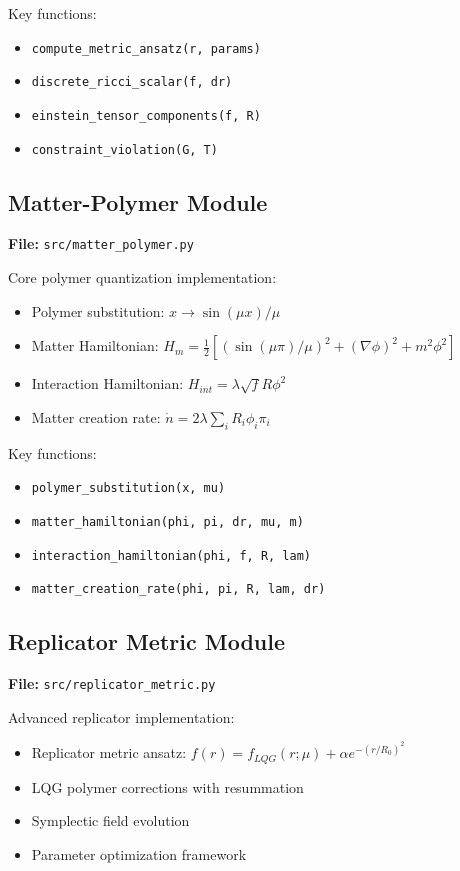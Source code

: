 \documentclass[11pt]{article}
\begin{document}
Key functions:
\begin{itemize}
\item \texttt{compute\_metric\_ansatz(r, params)}
\item \texttt{discrete\_ricci\_scalar(f, dr)}
\item \texttt{einstein\_tensor\_components(f, R)}
\item \texttt{constraint\_violation(G, T)}
\end{itemize}

\subsection{Matter-Polymer Module}

\textbf{File:} \texttt{src/matter\_polymer.py}

Core polymer quantization implementation:
\begin{itemize}
\item Polymer substitution: $x \to \sin(\mu x)/\mu$
\item Matter Hamiltonian: $H_m = \frac{1}{2}[(\sin(\mu\pi)/\mu)^2 + (\nabla\phi)^2 + m^2\phi^2]$
\item Interaction Hamiltonian: $H_{int} = \lambda\sqrt{f}R\phi^2$
\item Matter creation rate: $\dot{n} = 2\lambda \sum_i R_i \phi_i \pi_i$
\end{itemize}

Key functions:
\begin{itemize}
\item \texttt{polymer\_substitution(x, mu)}
\item \texttt{matter\_hamiltonian(phi, pi, dr, mu, m)}
\item \texttt{interaction\_hamiltonian(phi, f, R, lam)}
\item \texttt{matter\_creation\_rate(phi, pi, R, lam, dr)}
\end{itemize}

\subsection{Replicator Metric Module}

\textbf{File:} \texttt{src/replicator\_metric.py}

Advanced replicator implementation:
\begin{itemize}
\item Replicator metric ansatz: $f(r) = f_{LQG}(r;\mu) + \alpha e^{-(r/R_0)^2}$
\item LQG polymer corrections with resummation
\item Symplectic field evolution
\item Parameter optimization framework
\end{itemize}
\end{document}
